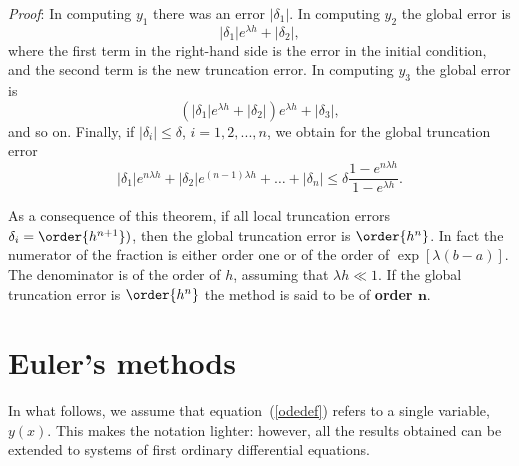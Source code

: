 \noindent
{\it Proof}: In computing $y_1$ there was an error $|\delta_1|$.  In
computing $y_2$ the global error is  
%
\begin{equation}
 |\delta_1| e^{\lambda h} + |\delta_2|,
 \label{IVP.eq:38}
\end{equation}
where the first term in the right-hand side is the error in the
initial condition, and the second term is the new truncation error. In
computing $y_3$ the global error is
%
\begin{equation}
 (|\delta_1| e^{\lambda h} + |\delta_2| ) e^{\lambda h} + |\delta_3|,
 \label{IVP.eq:39}
\end{equation}
%
and so on.  Finally, if $|\delta_i|\le \delta$, $i=1,2,...,n$, we
obtain for the global truncation error
%
\begin{equation}
 |\delta_1| e^{n\lambda h} + |\delta_2| e^{(n-1)\lambda h} + \ldots +
 |\delta_n| \le \delta \frac{1-e^{n\lambda h}}{1-e^{\lambda h}}.
 \label{IVP.eq:40}
\end{equation}

As a consequence of this theorem, if all local truncation errors
$\delta_i=\order{h^{n+1}})$, then the global truncation error is $\order{h^n}$.
In fact the numerator of the fraction is either order one or of the
order of $\exp[\lambda(b-a)]$.  The denominator is of the order of
$h$, assuming that $\lambda h \ll 1$.  If the global truncation error
is $\order{h^n}$ the method is said to be of \textbf{order
  $\boldsymbol{n}$}.

\section{Euler's methods}

In what follows, we assume that equation~(\ref{odedef}) refers to a
single variable, $y(x)$.  This makes the notation lighter: however,
all the results obtained can be extended to systems of first ordinary
differential equations.

